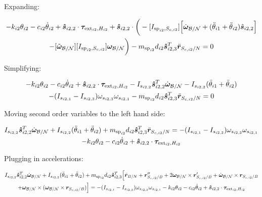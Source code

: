 \documentclass[paper]{aiaaNew}
\begin{document}
Expanding:

\begin{multline}
-k_{i2} \theta_{i2} - c_{i2} \dot{\theta}_{i2} + \bm{\hat{s}}_{i2,2} \cdot \bm \tau_{\text{ext}_{i2},H_{i2}} + \bm{\hat{s}}_{i2,2} \cdot \bigg(-[I_{\text{sp}_{i2},S_{c,i2}}] \Big[\dot{\bm \omega}_{\cal{B/N}} + (\ddot{\theta}_{i1}  + \ddot{\theta}_{i2})\hat{\bm s}_{i2,2}\Big]  \\
-[\tilde{\bm \omega}_{\cal{B/N}}] [I_{\text{sp}_{i2},S_{c,i2}}] \bm \omega_{\cal{B/N}} \bigg)
- m_{\text{sp}_{i2}} d_{i2}\bm{\hat{s}}_{i2,3}^T \ddot{\bm{r}}_{S_{c,i2}/N} = 0
\end{multline}

Simplifying:

\begin{multline}
	-k_{i2} \theta_{i2} - c_{i2} \dot{\theta}_{i2} + \bm{\hat{s}}_{i2,2} \cdot \bm \tau_{\text{ext}_{i2},H_{i2}} - I_{s_{i2,2}} \bm{\hat{s}}_{i2,2}^T \dot{\bm \omega}_{\cal{B/N}} - I_{s_{i2,2}} (\ddot{\theta}_{i1}  + \ddot{\theta}_{i2})  \\
	- (I_{s_{i2,1}} - I_{s_{i2,3}}) \omega_{s_{i2,3}} \omega_{s_{i2,1}}
	- m_{\text{sp}_{i2}} d_{i2}\bm{\hat{s}}_{i2,3}^T \ddot{\bm{r}}_{S_{c,i2}/N} = 0
\end{multline}

Moving second order variables to the left hand side:

\begin{multline}
	I_{s_{i2,2}} \bm{\hat{s}}_{i2,2}^T \dot{\bm \omega}_{\cal{B/N}} + I_{s_{i2,2}} (\ddot{\theta}_{i1}  + \ddot{\theta}_{i2}) + m_{\text{sp}_{i2}} d_{i2}\bm{\hat{s}}_{i2,3}^T \ddot{\bm{r}}_{S_{c,i2}/N} = - (I_{s_{i2,1}} - I_{s_{i2,3}}) \omega_{s_{i2,3}} \omega_{s_{i2,1}} \\-k_{i2} \theta_{i2} - c_{i2} \dot{\theta}_{i2}
	+ \bm{\hat{s}}_{i2,2} \cdot \bm \tau_{\text{ext}_{i2},H_{i2}} 
\end{multline}

Plugging in accelerations:

\begin{multline}
I_{s_{i2,2}} \bm{\hat{s}}_{i2,2}^T \dot{\bm \omega}_{\cal{B/N}} + I_{s_{i2,2}} (\ddot{\theta}_{i1}  + \ddot{\theta}_{i2}) + m_{\text{sp}_{i2}} d_{i2}\bm{\hat{s}}_{i2,3}^T \Big[\ddot{\bm{r}}_{B/N} + \bm{r}''_{S_{c,i2}/B} + 2 \bm\omega_{\cal B/N} \times \bm{r}'_{S_{c,i2}/B} +  \dot{\bm\omega}_{\cal B/N} \times \bm{r}_{S_{c,i2}/B} \\
+ \bm\omega_{\cal B/N} \times (\bm\omega_{\cal B/N} \times \bm{r}_{S_{c,i2}/B})\Big] = - (I_{s_{i2,1}} - I_{s_{i2,3}}) \omega_{s_{i2,3}} \omega_{s_{i2,1}} -k_{i2} \theta_{i2} - c_{i2} \dot{\theta}_{i2}
+ \bm{\hat{s}}_{i2,2} \cdot \bm \tau_{\text{ext}_{i2},H_{i2}} 
\end{multline}
\end{document}
